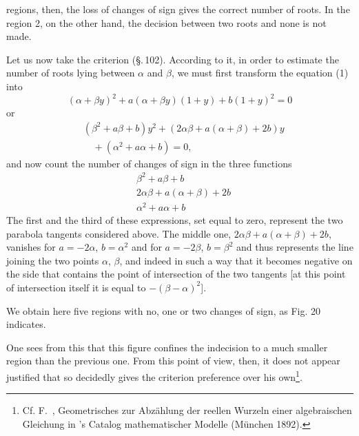 regions, then, the loss of changes of sign gives the correct number of
roots. In the region 2, on the other hand, the decision between two
roots and none is not made.

Let us now take the  criterion (\S.\,102). According
to it, in order to estimate the number of roots lying between $\alpha$
and $\beta$, we must first transform the equation (1) into
\[
(\alpha+\beta y)^2+a(\alpha+\beta y)(1+y)+b(1+y)^2=0
\]
or
\[
\begin{aligned}
&(\beta^2+a\beta+b)y^2+(2\alpha\beta+a(\alpha+\beta)+2b)y\\
&\quad{}+(\alpha^2+a\alpha+b)=0,
\end{aligned}
\]
and now count the number of changes of sign in the three functions
\[
\begin{aligned}
&\beta^2+a\beta+b\\
&2\alpha\beta+a(\alpha+\beta)+2b\\
&\alpha^2+a\alpha+b
\end{aligned}
\]
The first and the third of these expressions, set equal to zero,
represent the two parabola tangents considered above. The middle one,
$2\alpha\beta+a(\alpha+\beta)+2b$, vanishes for $a=-2\alpha$,
$b=\alpha^2$ and for $a=-2\beta$, $b=\beta^2$ and thus represents the
line joining the two points $\alpha$, $\beta$, and indeed in such a way
that it becomes negative on the side that contains the point of
intersection of the two tangents [at this point of intersection itself
it is equal to $-(\beta-\alpha)^2$].

We obtain here five regions with no, one or two changes of sign, as
Fig. 20 indicates.

One sees from this that this figure confines the indecision to a much
smaller region than the previous one. From this point of view, then, it
does not appear justified that  so decidedly gives the
 criterion preference over his
own\footnote{Cf. F.\ , Geometrisches zur
Abz\"ahlung der reellen Wurzeln einer algebraischen Gleichung in
's Catalog mathematischer Modelle (M\"unchen 1892).}.
